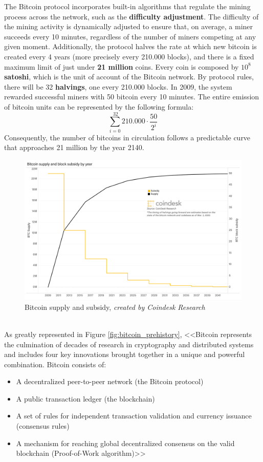 The Bitcoin protocol incorporates built-in algorithms that regulate the mining process across the network, such as the \textbf{difficulty adjustment}. The difficulty of the mining activity is dynamically adjusted to ensure that, on average, a miner succeeds every 10 minutes, regardless of the number of miners competing at any given moment. Additionally, the protocol halves the rate at which new bitcoin is created every 4 years (more precisely every 210.000 blocks), and there is a fixed maximum limit of just under \textbf{21 million} coins. Every coin is composed by \textbf{$10^8$ satoshi}, which is the unit of account of the Bitcoin network. By protocol rules, there will be 32 \textbf{halvings}, one every 210.000 blocks. In 2009, the system rewarded successful miners with 50 bitcoin every 10 minutes. The entire emission of bitcoin units can be represented by the following formula:
\[ \sum_{i=0}^{\ 32} 210.000\cdot\frac{50}{2^{i}} \]
Consequently, the number of bitcoins in circulation follows a predictable curve that approaches 21 million by the year 2140. 
\begin{figure}[ht]
\centering
\includegraphics[width=13cm]{Figures/bitcoin/supply_subsidy.png}
\caption{Bitcoin supply and subsidy, \textit{created by Coindesk Research}}
\label{fig:bitcoin_supply}
\end{figure}
\newline\\
As greatly represented in Figure \ref{fig:bitcoin_prehistory}, <<Bitcoin represents the culmination of decades of research in cryptography and distributed systems and includes four key innovations brought together in a unique and powerful combination. Bitcoin consists of:
\begin{itemize}
    \item A decentralized peer-to-peer network (the Bitcoin protocol)
    \item A public transaction ledger (the blockchain)
    \item A set of rules for independent transaction validation and currency issuance (consensus rules)
    \item A mechanism for reaching global decentralized consensus on the valid blockchain (Proof-of-Work algorithm)>> \cite{masteringbitcoin}
\end{itemize}
